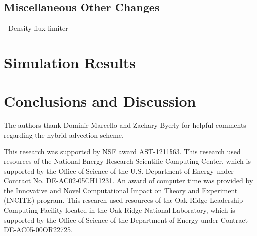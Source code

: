 \documentclass[twocolumn,numberedappendix]{../aastex6}
\begin{document}
\subsection{Miscellaneous Other Changes}
\label{sec:hydro-other-changes}

- Density flux limiter



\section{Simulation Results}\label{sec:results}



\section{Conclusions and Discussion}\label{sec:Conclusions and Discussion}


\acknowledgments

The authors thank Dominic Marcello and Zachary Byerly for helpful comments
regarding the hybrid advection scheme.

This research was supported by NSF award AST-1211563.  This research
used resources of the National Energy Research Scientific Computing
Center, which is supported by the Office of Science of the
U.S. Department of Energy under Contract No. DE-AC02-05CH11231.  An
award of computer time was provided by the Innovative and Novel
Computational Impact on Theory and Experiment (INCITE) program.  This
research used resources of the Oak Ridge Leadership Computing Facility
located in the Oak Ridge National Laboratory, which is supported by
the Office of Science of the Department of Energy under Contract
DE-AC05-00OR22725.

\clearpage





\clearpage
\appendix
\end{document}
